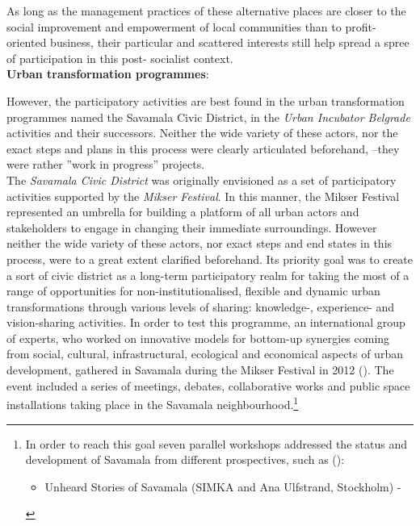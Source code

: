 \documentclass[11pt]{report}
\begin{document}
{{{{As long as the management practices of these alternative places are closer to the social improvement and empowerment of local communities than to profit-oriented business, their particular and scattered interests still help spread a spree of participation in this post- socialist context.
\\	

\textbf{Urban transformation programmes}:

However, the participatory activities are best found in  the urban transformation programmes named the Savamala Civic District, in the \textit{Urban Incubator Belgrade} activities and their successors. Neither the wide variety of these actors, nor the exact steps and plans in this process were clearly articulated beforehand, --they were rather ”work in progress” projects.
\\

The \textit{Savamala Civic District} was originally envisioned as a set of participatory activities supported by the \textit{Mikser Festival}. In this manner, the Mikser Festival represented an umbrella for building a platform of all urban actors and stakeholders to engage in changing their immediate surroundings. However neither the wide variety of these actors, nor exact steps and end states in this process, were to a great extent clarified beforehand.
Its priority goal was to create a sort of civic district as a long-term participatory realm for taking the most of a range of opportunities for non-institutionalised, flexible and dynamic urban transformations through various levels of sharing: knowledge-, experience- and vision-sharing activities. In order to test this programme, an international group of experts, who worked on innovative models for bottom-up synergies coming from social, cultural, infrastructural, ecological and economical aspects of urban development, gathered in Savamala during the Mikser Festival in 2012 (\href{Cvetinovic}{\citealt{cvetinovic_engine_2013}}).
The event included a series of meetings, debates, collaborative works and public space installations taking place in the Savamala neighbourhood.\footnote{In order to reach this goal seven parallel workshops addressed the status and development of Savamala from different prospectives, such as (\href{Cvetinovic}{\citealt{cvetinovic_engine_2013}}):
\begin{itemize}

\item Unheard Stories of Savamala (SIMKA and Ana Ulfstrand, Stockholm) -


\end{itemize}}}}}}
\end{document}
